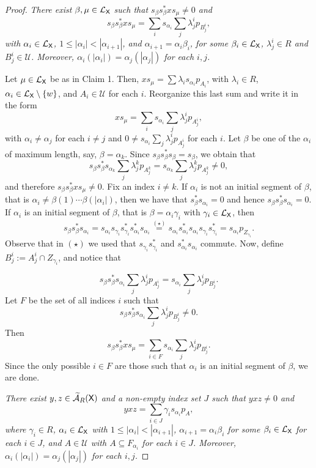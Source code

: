 \documentclass[a4paper,12pt]{amsart}
\theoremstyle{definition}
\theoremstyle{remark}
\numberwithin{equation}{section}
\newcommand{\osf}{{\normalfont \textsf{X}}}
\newcommand{\lang}{\CL_{\osf}}
\newcommand{\ualgshift}{\TCA_R(\osf)}
\newcommand{\CA}{\mathcal{A}}
\newcommand{\CL}{\mathcal{L}}
\newcommand{\TCA}{\widetilde{\CA}}
\newcommand{\TCB}{\mathcal{U}}
\begin{document}
\begin{proof}
\smallskip
{} {\it There exist $\beta,\mu \in \lang$ such that $s_\beta s_\beta^* x s_\mu\neq 0$ and 
$$s_\beta s_\beta^*xs_\mu=\sum\limits_i s_{\alpha_i}\sum\limits_j \lambda_j^ip_{B_j^i},$$ with $\alpha_i\in \lang$, $1\leq|\alpha_i|<|\alpha_{i+1}|$, and $\alpha_{i+1}=\alpha_i\beta_i$, for some $\beta_i\in \lang$, $\lambda_j^i\in R$ and $B_j^i\in \TCB$. Moreover, $\alpha_i(|\alpha_i|)=\alpha_j(|\alpha_j|)$ for each $i, j$.}
\smallskip

Let $\mu\in \lang$ be as in Claim 1. Then, $xs_\mu=\sum\limits\lambda_i s_{\alpha_i}p_{A_i}$,  with $\lambda_i\in R$, $\alpha_i\in \lang\setminus \{w\}$, and $A_i\in \TCB$ for each $i$. Reorganize this last sum and write it in the form   
$$xs_\mu=\sum\limits_i s_{\alpha_i}\sum\limits_j \lambda_j^ip_{A_j^i},$$ with $\alpha_i\neq \alpha_j$ for each $i\neq j$ and $0\neq s_{\alpha_i}\sum\limits_j \lambda_j^ip_{A_j^i}$ for each $i$.
 Let $\beta$ be one of the $\alpha_i$ of maximum length, say, $\beta=\alpha_k$. Since $s_\beta s_\beta^*s_\beta=s_\beta$, we obtain that $$s_\beta s_\beta^*s_{\alpha_k}\sum\limits_j \lambda_j^kp_{A_j^k}=s_{\alpha_k}\sum\limits_j \lambda_j^kp_{A_j^k} \neq 0,$$ and therefore $s_\beta s_\beta^*xs_\mu\neq 0$. 
 Fix an index $i\neq k$. If $\alpha_i$ is not an initial segment of $\beta$, that is  $\alpha_i\neq \beta(1)\cdots\beta(|\alpha_i|)$, then we have that $s_\beta^*s_{\alpha_i}=0$ and hence $s_\beta s_\beta^* s_{\alpha_i}=0$. If $\alpha_i$ is an initial segment of $\beta$, that is $\beta=\alpha_i\gamma_i$ with $\gamma_i\in \lang$, then $$s_\beta s_\beta^*s_{\alpha_i}=s_{\alpha_i}s_{\gamma_i} s_{\gamma_i}^*s_{\alpha_i}^*s_{\alpha_i}\stackrel{(\star)}{=}s_{\alpha_i}s_{\alpha_i}^*s_{\alpha_i}s_{\gamma_i} s_{\gamma_i}^*=s_{\alpha_i} p_{Z_{\gamma_i}}.$$
Observe that in $(\star)$ we used that $s_{\gamma_i} s_{\gamma_i}^*$ and $s_{\alpha_i}^*s_{\alpha_i}$ commute.
Now, define $B_j^i:=A_j^i\cap Z_{\gamma_i}$, and notice that 
 
 $$s_\beta s_\beta^* s_{\alpha_i}\sum\limits_j \lambda_j^i p_{A_j^i}=s_{\alpha_i} \sum\limits_j \lambda_j^i p_{B_j^i}.$$
Let $F$ be the set of all indices $i$ such that $$s_\beta s_\beta^* s_{\alpha_i}\sum\limits_j \lambda_j^ip_{B_j^i}\neq 0.$$ 
Then  $$s_\beta s_\beta^*xs_\mu=\sum\limits_{i\in F} s_{\alpha_i}\sum\limits_j \lambda_j^ip_{B_j^i}.$$
Since the only possible $i\in F$ are those such that $\alpha_i$ is an initial segment of $\beta$, we are done.

\smallskip
{} {\it There exist $y,z\in \ualgshift$ and a non-empty index set $J$ such that $yxz\neq 0$ and 
$$yxz=\sum\limits_{i\in J}\gamma_i s_{\alpha_i}p_A,$$ where $\gamma_i \in R$, $\alpha_i \in \lang$ with $1\leq |\alpha_i|<|\alpha_{i+1}|$,  $\alpha_{i+1}=\alpha_i\beta_i$ for some $\beta_i\in \lang$ for each $i \in J$, and $A\in \TCB$ with $A\subseteq F_{\alpha_i}$ for each $i\in J$. Moreover, $\alpha_i(|\alpha_i|)=\alpha_j(|\alpha_j|)$ for each $i, j$.}
\smallskip


\end{proof}
\end{document}
